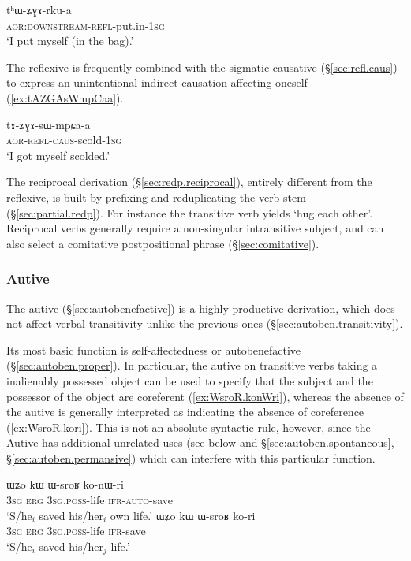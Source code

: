 \begin{exe}
\ex \label{ex:thWZGArkua}
\gll  tʰɯ-ʑɣɤ-rku-a \\
\textsc{aor}:\textsc{downstream}-\textsc{refl}-put.in-\textsc{1sg} \\
\glt `I put myself (in the bag).'
\end{exe}
  
 The reflexive is frequently combined with the sigmatic causative (§\ref{sec:refl.caus}) to express an unintentional indirect causation affecting oneself (\ref{ex:tAZGAsWmpCaa}).
 
\begin{exe}
\ex \label{ex:tAZGAsWmpCaa}
\gll tɤ-ʑɣɤ-sɯ-mpɕa-a \\
\textsc{aor}-\textsc{refl}-\textsc{caus}-scold-\textsc{1sg} \\
\glt `I got myself scolded.' 
\end{exe}
 
The reciprocal derivation (§\ref{sec:redp.reciprocal}), entirely different from the reflexive, is built by prefixing  and reduplicating the verb stem (§\ref{sec:partial.redp}). For instance the transitive verb  yields  `hug each other'. Reciprocal verbs generally require a non-singular intransitive subject, and can also select a comitative postpositional phrase (§\ref{sec:comitative}).

\subsubsection{Autive}
The autive  (§\ref{sec:autobenefactive}) is a highly productive derivation, which 
does not affect verbal transitivity unlike the previous ones (§\ref{sec:autoben.transitivity}). 

Its most basic function is self-affectedness or autobenefactive (§\ref{sec:autoben.proper}). In particular, the autive on transitive verbs taking a inalienably possessed object can be used to specify that the subject and the possessor of the object are coreferent (\ref{ex:WsroR.konWri}), whereas the absence of the autive is generally interpreted as indicating the absence of coreference (\ref{ex:WsroR.kori}). This is not an absolute syntactic rule, however, since the Autive has additional unrelated uses (see below and §\ref{sec:autoben.spontaneous}, §\ref{sec:autoben.permansive}) which can interfere with this particular function.

\begin{exe}
\ex 
\begin{xlist}
\ex \label{ex:WsroR.konWri}
\gll ɯʑo kɯ ɯ-sroʁ ko-nɯ-ri  \\
\textsc{3sg} \textsc{erg} \textsc{3sg}.\textsc{poss}-life \textsc{ifr}-\textsc{auto}-save  \\
\glt `S/he$_i$ saved his/her$_i$ own life.' 
\ex \label{ex:WsroR.kori}
\gll ɯʑo kɯ ɯ-sroʁ ko-ri  \\
\textsc{3sg} \textsc{erg} \textsc{3sg}.\textsc{poss}-life \textsc{ifr}-save  \\
\glt `S/he$_i$ saved his/her$_j$ life.'
\end{xlist}
\end{exe}

